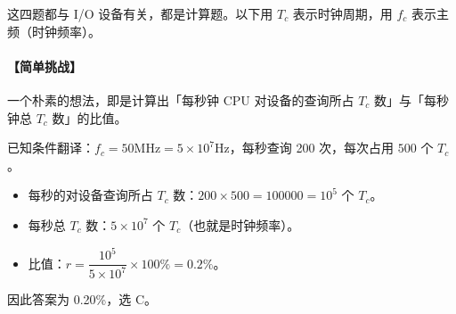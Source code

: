 \documentclass[UTF8]{ctexart}
\begin{document}
\newpage
{}
\BgThispage
这四题都与 I/O 设备有关，都是计算题。以下用 $T_c$ 表示时钟周期，用 $f_c$ 表示主频（时钟频率）。

\paragraph{【简单挑战】} 一个朴素的想法，即是计算出\textcolor{cyan!70!black}{「每秒钟 CPU 对设备的查询所占 $T_c$ 数」}与\textcolor{cyan!70!black}{「每秒钟总 $T_c$ 数」}的比值。

已知条件翻译：$f_c = \mathrm{50MHz = 5\times 10^7 Hz}$，每秒查询 200 次，每次占用 $500$ 个 $T_c$。

\begin{itemize}[itemsep=1pt, parsep=1pt]
  \item 每秒的对设备查询所占 $T_c$ 数：$200\times 500 = 100000 = 10^5$ 个 $T_c$。
  \item 每秒总 $T_c$ 数：$5\times 10^7$ 个 $T_c$（也就是时钟频率）。
  \item 比值：$r = \dfrac{10^5}{5\times 10^7}\times 100\% = 0.2\%$。
\end{itemize}
因此答案为 0.20\%，选 C。
\end{document}
